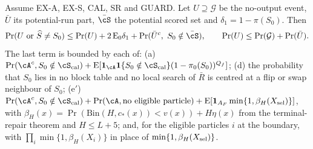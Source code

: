 \begin{theorem}\label{thm:composition}
Assume EX-A, EX-S, CAL, SR and GUARD. Let $U\supseteq\mathcal G$ be the no-output event, $\bar U$ its potential-run
part, $\bar\cS$ the potential scored set and $\delta_1=1-\pi(S_0)$. Then
\[
\Pr(U\text{ or }\widehat S\ne S_0)\le\Pr(U)+2\,\mathrm E_0\delta_1+\Pr(\bar U^c,\ S_0\notin\bar\cS),
\qquad \Pr(U)\le\Pr(\mathcal G)+\Pr(\bar U).
\]
The last term is bounded by each of:
(a) $\Pr(\cA^c,S_0\notin\cS_{\rm cal})+\mathrm E[\mathbf 1_{\cA}\mathbf 1\{S_0\notin\cS_{\rm cal}\}(1-\pi_0(S_0))^{Q_f}]$;
(d) the probability that $S_0$ lies in no block table and no local search of $\bar R$ is centred at a flip or swap
neighbour of $S_0$;
(e$'$) $\Pr(\cA^c,S_0\notin\cS_{\rm cal})+\Pr(\cA,\text{no eligible particle})+\mathrm E[\mathbf 1_{A_F}\min\{1,\beta_H(X_{\rm sel})\}]$,
with $\beta_H(x)=\Pr(\mathrm{Bin}(H,c_*(x))<v(x))+H\eta(x)$ from the terminal-repair theorem and $H\le L+5$;
and, for the eligible particles $i$ at the boundary, with $\prod_i\min\{1,\beta_H(X_i)\}$ in place of
$\min\{1,\beta_H(X_{\rm sel})\}$.
\end{theorem}
